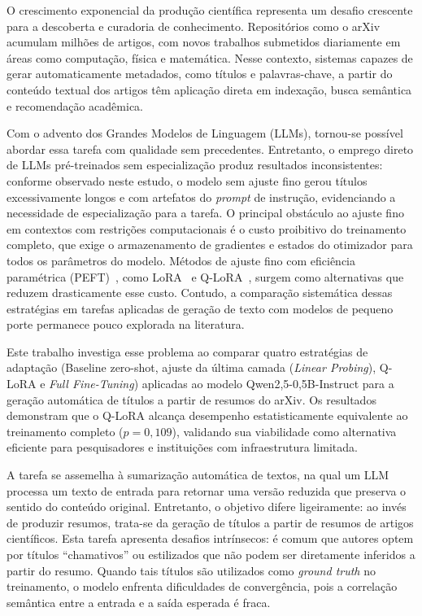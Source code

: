 

O crescimento exponencial da produção científica representa um desafio crescente para a descoberta e curadoria de conhecimento. Repositórios como o arXiv \cite{arxivorg_submitters_arxiv_nodate} acumulam milhões de artigos, com novos trabalhos submetidos diariamente em áreas como computação, física e matemática. Nesse contexto, sistemas capazes de gerar automaticamente metadados, como títulos e palavras-chave, a partir do conteúdo textual dos artigos têm aplicação direta em indexação, busca semântica e recomendação acadêmica.

Com o advento dos Grandes Modelos de Linguagem (LLMs), tornou-se possível abordar essa tarefa com qualidade sem precedentes. Entretanto, o emprego direto de LLMs pré-treinados sem especialização produz resultados inconsistentes: conforme observado neste estudo, o modelo sem ajuste fino gerou títulos excessivamente longos e com artefatos do \textit{prompt} de instrução, evidenciando a necessidade de especialização para a tarefa. O principal obstáculo ao ajuste fino em contextos com restrições computacionais é o custo proibitivo do treinamento completo, que exige o armazenamento de gradientes e estados do otimizador para todos os parâmetros do modelo. Métodos de ajuste fino com eficiência paramétrica (PEFT)~\cite{ding_parameter-efficient_2023}, como LoRA~\cite{hu_lora_2022} e Q-LoRA~\cite{dettmers_qlora_2023}, surgem como alternativas que reduzem drasticamente esse custo. Contudo, a comparação sistemática dessas estratégias em tarefas aplicadas de geração de texto com modelos de pequeno porte permanece pouco explorada na literatura.

Este trabalho investiga esse problema ao comparar quatro estratégias de adaptação (Baseline zero-shot, ajuste da última camada (\textit{Linear Probing}), Q-LoRA e \textit{Full Fine-Tuning}) aplicadas ao modelo Qwen2,5-0,5B-Instruct para a geração automática de títulos a partir de resumos do arXiv. Os resultados demonstram que o Q-LoRA alcança desempenho estatisticamente equivalente ao treinamento completo ($p = 0,109$), validando sua viabilidade como alternativa eficiente para pesquisadores e instituições com infraestrutura limitada.

A tarefa se assemelha à sumarização automática de textos, na qual um LLM processa um texto de entrada para retornar uma versão reduzida que preserva o sentido do conteúdo original. Entretanto, o objetivo difere ligeiramente: ao invés de produzir resumos, trata-se da geração de títulos a partir de resumos de artigos científicos. Esta tarefa apresenta desafios intrínsecos: é comum que autores optem por títulos ``chamativos'' ou estilizados que não podem ser diretamente inferidos a partir do resumo. Quando tais títulos são utilizados como \textit{ground truth} no treinamento, o modelo enfrenta dificuldades de convergência, pois a correlação semântica entre a entrada e a saída esperada é fraca.

